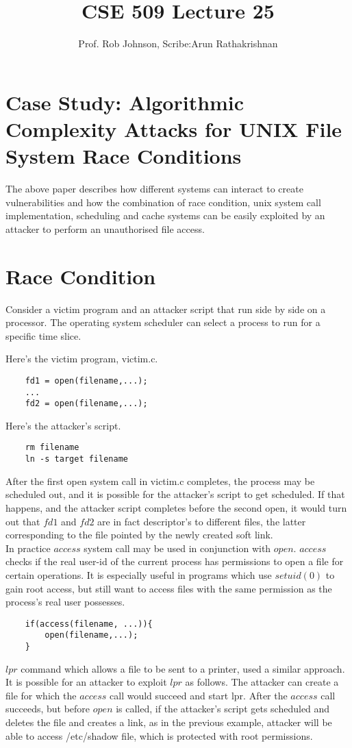 \documentclass[11pt]{article} %
\title{CSE 509 Lecture 25}
\author{Prof. Rob Johnson, Scribe:Arun Rathakrishnan}
\begin{document}
\maketitle
\section {Case Study: Algorithmic Complexity Attacks for UNIX File System Race Conditions}
The above paper describes how different systems can interact to create vulnerabilities
and how the combination of race condition, unix system call implementation, scheduling and cache 
systems can be easily exploited by an attacker to perform an unauthorised file
access.

\section {Race Condition}
Consider a victim program and an attacker script that run side by side on a
processor. The operating system scheduler can select a process to run for a
specific time slice.

Here's the victim program, victim.c.
\begin{verbatim}
    fd1 = open(filename,...);
    ...
    fd2 = open(filename,...);
\end{verbatim}

Here's the attacker's script.
\begin{verbatim}
    rm filename
   	ln -s target filename
\end{verbatim}
After the first open system call in victim.c completes, the process may be
scheduled out, and it is possible for the attacker's script to get scheduled.
If that happens, and the attacker script completes before the second open, it
would turn out that $fd1$ and $fd2$ are in fact descriptor's to different files,
the latter corresponding to the file pointed by the newly created soft link.\\

In practice $access$ system call may be used in conjunction with $open$. $access$
checks if the real user-id of the current process has permissions to open a file
for certain operations. It is especially useful in programs which use $setuid(0)$
to gain root access, but still want to access files with the same permission as
the process's real user possesses.
\begin{verbatim}
    if(access(filename, ...)){
        open(filename,...);
    }
\end{verbatim}
$lpr$ command which allows a file to be sent to a printer, used a similar approach.
It is possible for an attacker to exploit $lpr$ as follows. The attacker can
create a file for which the $access$ call would succeed and start lpr. After
the $access$ call succeeds, but before $open$ is called, if the attacker's
script gets scheduled and deletes the file and creates a link, as in the
previous example, attacker will be able to access /etc/shadow file, which is
protected with root permissions.
\end{document}
